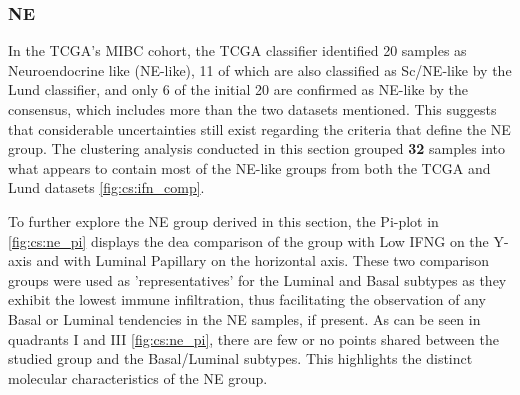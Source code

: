 \subsubsection{NE} \label{s:cs:ne_interp}


In the TCGA's MIBC cohort, the TCGA classifier identified 20 samples as Neuroendocrine like (NE-like), 11 of which are also classified as Sc/NE-like by the Lund classifier, and only 6 of the initial 20 are confirmed as NE-like by the consensus, which includes more than the two datasets mentioned. This suggests that considerable uncertainties still exist regarding the criteria that define the NE group. The clustering analysis conducted in this section grouped \textbf{32} samples into what appears to contain most of the NE-like groups from both the TCGA and Lund datasets \cref{fig:cs:ifn_comp}.

To further explore the NE group derived in this section, the Pi-plot in \cref{fig:cs:ne_pi} displays the \acrshort{dea} comparison of the group with Low IFNG on the Y-axis and with Luminal Papillary on the horizontal axis. These two comparison groups were used as 'representatives' for the Luminal and Basal subtypes as they exhibit the lowest immune infiltration, thus facilitating the observation of any Basal or Luminal tendencies in the NE samples, if present. As can be seen in quadrants I and III \cref{fig:cs:ne_pi}, there are few or no points shared between the studied group and the Basal/Luminal subtypes. This highlights the distinct molecular characteristics of the NE group.

